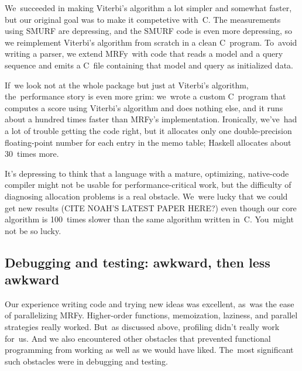 \documentclass[]{jfp1}
\newcommand\mrfy{MRFy} %
\newcommand\seclabel[1]{\label{sec:#1}}
\newif\ifverbatimsmall
\newcommand\smallverbatiminput[1]{%
  \verbatimsmalltrue
  \presvtopsep=\topsep
  \topsep=0.78\topsep
  \verbatimsmallfalse
  \topsep=\presvtopsep
}
\begin{document}






We~succeeded in making Viterbi's algorithm a lot simpler and somewhat
faster, but our original goal was to make it competetive with~C.
The measurements using SMURF are depressing, and the SMURF code is
even more depressing, so we reimplement Viterbi's algorithm from
scratch in a clean C~program.
To~avoid writing a parser, we extend \mrfy\ with code that reads a
model and a query sequence and emits a C~file containing that model
and query as initialized data.


If~we look not at the whole package but just at Viterbi's algorithm,
the~performance story is even more grim:
we~wrote a custom C~program that computes a score using Viterbi's
algorithm and does nothing else, and it runs about a hundred times
faster than \mrfy's implementation.
Ironically, we've~had a lot of trouble getting the code right, but it
allocates only one double-precision floating-point number for each
entry in the memo table; Haskell allocates about 30~times more.

It's depressing to think that a language with a mature, optimizing,
native-code compiler might not be usable for performance-critical
work, but the difficulty of diagnosing allocation problems is a real
obstacle.
We~were lucky that we could get new results (CITE NOAH'S LATEST PAPER
HERE?) even though our core algorithm is 100~times slower than the
same algorithm written in~C.
You~might not be so lucky.



\subsection{Debugging and testing: awkward, then  less awkward}

\seclabel{awkward-profiling}

Our experience writing code and trying new ideas was excellent, as~was
the ease of parallelizing \mrfy.
Higher-order functions, memoization, laziness, and parallel strategies
really worked.
But~as discussed above, profiling didn't really work for~us.
And we also encountered other obstacles that prevented functional
programming from working as well as we would have liked.
The~most significant such obstacles were in debugging and testing.
\end{document}
